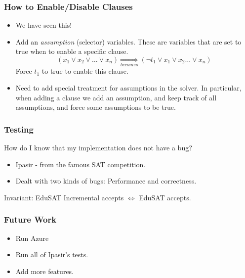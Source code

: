 \documentclass{beamer}
\begin{document}
\begin{frame}
    \frametitle{How to Enable/Disable Clauses}
    \begin{itemize}
        \item<2-> We have seen this!
        \item<3-> Add an \emph{assumption} (selector) variables. These are variables that
            are set to true when to enable a specific clause.
            $$
            (x_1 \lor x_2 \lor \dots \lor x_n)
            \underset{becomes}{\Longrightarrow}
            (\neg t_1 \lor x_1 \lor x_2 \dots \lor x_n)
            $$
            Force $t_1$ to true to enable this clause.
        \item<4-> Need to add special treatment for assumptions in the solver.
            In particular, when adding a clause we add an assumption, and keep
            track of all assumptions, and force some assumptions to be true.
    \end{itemize}
\end{frame}

\begin{frame}
    \frametitle{Testing}
    How do I know that my implementation does not have a bug?
    \begin{itemize}
        \item Ipasir - from the famous SAT competition.
        \item Dealt with two kinds of bugs: Performance and correctness.
    \end{itemize}
    Invariant: EduSAT Incremental accepts $\iff$ EduSAT accepts.
\end{frame}

\begin{frame}
    \frametitle{Future Work}
    \begin{itemize}
        \item Run Azure
        \item Run all of Ipasir's tests.
        \item Add more features.
    \end{itemize}
\end{frame}
\end{document}
